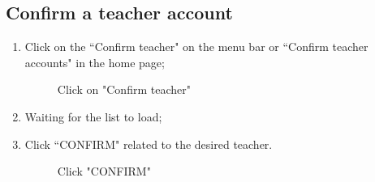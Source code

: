 \documentclass[ManualeUtente]{subfiles}
\begin{document}
\subsection{Confirm a teacher account}
\begin{enumerate}
	\item Click on the \textquotedblleft Confirm teacher" on the menu bar or \textquotedblleft Confirm teacher accounts" in the home page;
	\begin{figure}[H]
		\centering
		\caption{Click on "Confirm teacher"}
		\label{fig:Click on "Confirm teacher"}
	\end{figure}
	\item Waiting for the list to load;
	\item Click \textquotedblleft CONFIRM" related to the desired teacher.
	\begin{figure}[H]
		\centering
		\caption{Click "CONFIRM"}
		\label{fig:Click "CONFIRM"}
	\end{figure}
\end{enumerate}
\end{document}
